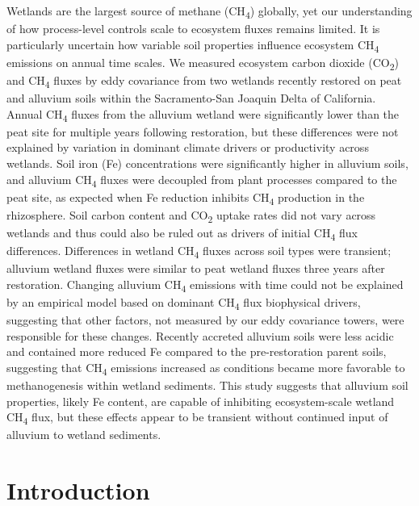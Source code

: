 \documentclass[
  12pt,
]{article}
\begin{document}
Wetlands are the largest source of methane (CH\textsubscript{4})
globally, yet our understanding of how process-level controls scale to
ecosystem fluxes remains limited. It is particularly uncertain how
variable soil properties influence ecosystem CH\textsubscript{4}
emissions on annual time scales. We measured ecosystem carbon dioxide
(CO\textsubscript{2}) and CH\textsubscript{4} fluxes by eddy covariance
from two wetlands recently restored on peat and alluvium soils within
the Sacramento-San Joaquin Delta of California. Annual
CH\textsubscript{4} fluxes from the alluvium wetland were significantly
lower than the peat site for multiple years following restoration, but
these differences were not explained by variation in dominant climate
drivers or productivity across wetlands. Soil iron (Fe) concentrations
were significantly higher in alluvium soils, and alluvium
CH\textsubscript{4} fluxes were decoupled from plant processes compared
to the peat site, as expected when Fe reduction inhibits
CH\textsubscript{4} production in the rhizosphere. Soil carbon content
and CO\textsubscript{2} uptake rates did not vary across wetlands and
thus could also be ruled out as drivers of initial CH\textsubscript{4}
flux differences. Differences in wetland CH\textsubscript{4} fluxes
across soil types were transient; alluvium wetland fluxes were similar
to peat wetland fluxes three years after restoration. Changing alluvium
CH\textsubscript{4} emissions with time could not be explained by an
empirical model based on dominant CH\textsubscript{4} flux biophysical
drivers, suggesting that other factors, not measured by our eddy
covariance towers, were responsible for these changes. Recently accreted
alluvium soils were less acidic and contained more reduced Fe compared
to the pre-restoration parent soils, suggesting that CH\textsubscript{4}
emissions increased as conditions became more favorable to
methanogenesis within wetland sediments. This study suggests that
alluvium soil properties, likely Fe content, are capable of inhibiting
ecosystem-scale wetland CH\textsubscript{4} flux, but these effects
appear to be transient without continued input of alluvium to wetland
sediments.

\newpage

\section{Introduction}\label{introduction}
\end{document}
